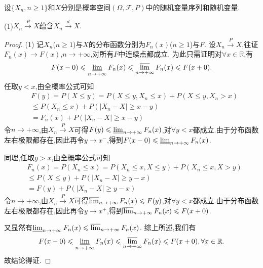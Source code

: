 \documentclass[lang=cn,newtx,10pt,sCheme=Chinese,citestyle=gb7714-2015, bibstyle=gb7714-2015]{../../Template/elegantbook}
\begin{document}
\begin{theorem}[依概率收敛与依分布收敛的关系]\label{theorem:依概率收敛与依分布收敛的关系}
设\(\{ X_n, n \geqslant 1\}\)和$X$分别是概率空间\((\varOmega, \mathcal{F}, P)\)中的随机变量序列和随机变量.

(1)$X_n\overset{P}{\rightarrow}X\text{蕴含}X_n\overset{d}{\rightarrow}X.$

\end{theorem}
\begin{proof}

(1)
记\(X_n\)(\(n\geqslant  1\))与\(X\)的分布函数分别为\(F_n(x)\)(\(n\geqslant  1\))与\(F\).
设\(X_n\overset{P}{\rightarrow}X\),往证\(F_n(x) \to F(x)\),\(n \to +\infty\),对所有\(F\)中连续点都成立.
为此只需证明对\(\forall x\in \mathbb{R}\),有
\begin{align*}
F(x - 0) \leqslant \varliminf_{n \to +\infty}F_n(x) \leqslant \varlimsup_{n \to +\infty}F_n(x) \leqslant F(x + 0).
\end{align*}
任取\(y < x\),由全概率公式可知
\begin{align*}
&F(y) = P(X\leqslant y) = P(X\leqslant y, X_n\leqslant x) + P(X\leqslant y, X_n > x)
\\
&\leqslant P(X_n\leqslant x) + P(|X_n - X|\geqslant x - y)
\\
&= F_n(x) + P(|X_n - X|\geqslant x - y)
\end{align*}
令\(n \to +\infty\),由\(X_n\overset{P}{\rightarrow}X\)可得\(F(y) \leqslant \varliminf_{n \to +\infty}F_n(x)\),对\(\forall y < x\)都成立.由于分布函数左右极限都存在,因此再令\(y \to x^-\),得到\(F(x - 0) \leqslant \varliminf_{n \to +\infty}F_n(x)\).

同理,任取\(y > x\),由全概率公式可知
\begin{align*}
&F_n(x) = P(X_n\leqslant x) = P(X_n\leqslant x, X\leqslant y) + P(X_n\leqslant x, X > y)
\\
&\leqslant P(X\leqslant y) + P(|X_n - X|\geqslant y - x)
\\
&= F(y) + P(|X_n - X|\geqslant y - x)
\end{align*}
令\(n \to +\infty\),由\(X_n\overset{P}{\rightarrow}X\)可得\(\varlimsup_{n \to +\infty}F_n(x) \leqslant F(y)\),对\(\forall y < x\)都成立.由于分布函数左右极限都存在,因此再令\(y \to x^+\),得到\(\varlimsup_{n \to +\infty}F_n(x) \leqslant F(x + 0)\).

又显然有\(\varliminf_{n \to +\infty}F_n(x) \leqslant \varlimsup_{n \to +\infty}F_n(x)\).
综上所述,我们有
\begin{align*}
F(x - 0) \leqslant \varliminf_{n \to +\infty}F_n(x) \leqslant \varlimsup_{n \to +\infty}F_n(x) \leqslant F(x + 0),\forall x\in \mathbb{R} .
\end{align*}
故结论得证.

\end{proof}
\end{document}
